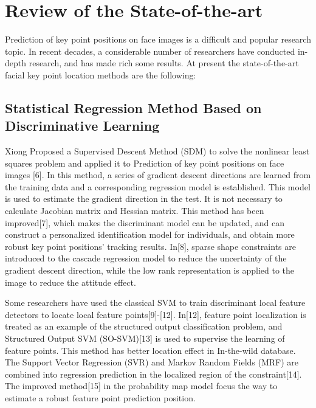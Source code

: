 \documentclass{article}
\begin{document}
\section{Review of the State-of-the-art}
Prediction of key point positions on face images is a difficult and popular research topic. In recent decades, a considerable number of researchers have conducted in-depth research, and has made rich some results. At present the state-of-the-art facial key point location methods are the following:
\subsection{Statistical Regression Method Based on Discriminative Learning}
Xiong Proposed a Supervised Descent Method (SDM) to solve the nonlinear least squares problem and applied it to Prediction of key point positions on face images [6]. In this method, a series of gradient descent directions are learned from the training data and a corresponding regression model is established. This model is used to estimate the gradient direction in the test. It is not necessary to calculate Jacobian matrix and Hessian matrix. This method has been improved[7], which makes the discriminant model can be updated, and can construct a personalized identification model for individuals, and obtain more robust key point positions' tracking results. In[8], sparse shape constraints are introduced to the cascade regression model to reduce the uncertainty of the gradient descent direction, while the low rank representation is applied to the image to reduce the attitude effect.

Some researchers have used the classical SVM to train discriminant local feature detectors to locate local feature points[9]-[12]. In[12], feature point localization is treated as an example of the structured output classification problem, and Structured Output SVM (SO-SVM)[13] is used to supervise the learning of feature points. This method has better location effect in In-the-wild database. The Support Vector Regression (SVR) and Markov Random Fields (MRF) are combined into regression prediction in the localized region of the constraint[14]. The improved method[15] in the probability map model focus the way to estimate a robust feature point prediction position.
\end{document}
